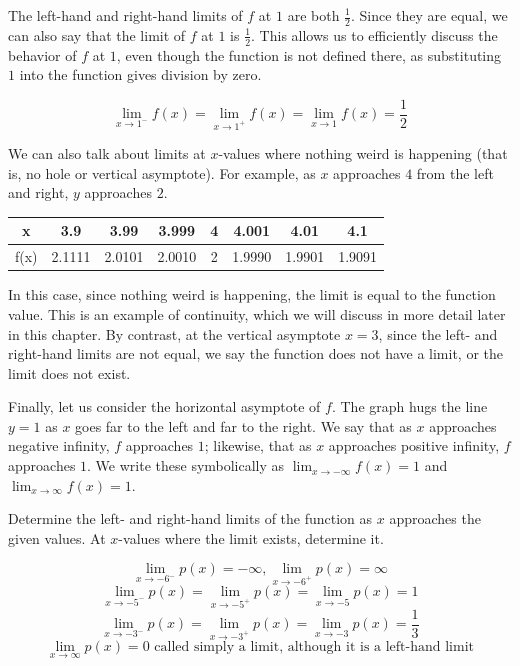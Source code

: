 The left-hand and right-hand limits of $ f $ at $ 1 $ are both $\frac{1}{2}$. Since 
they are equal, we can also say that the limit of $ f $ at $ 1 $ is $\frac{1}{2}$. 
This allows us to efficiently discuss the behavior of $ f $ at $ 1 $, even though 
the function is not defined there, as substituting $ 1 $ into the function gives 
division by zero.

$$ \lim_{x \rightarrow 1^-} f(x) = \lim_{x \rightarrow 1^+} f(x) = \lim_{x 
\rightarrow 1} f(x) = \frac{1}{2} $$

We can also talk about limits at $x$-values where nothing weird is happening (that 
is, no hole or vertical asymptote). For example, as $x$ approaches $4$ from the left 
and right, $y$ approaches $2$.

\begin{center}
\begin{tabular}{ |c|c|c|c|c|c|c|c| } 
 \hline
 x & 3.9 & 3.99 & 3.999 & 4 & 4.001 & 4.01 & 4.1 \\ 
 \hline
 f(x) & 2.1111 & 2.0101 & 2.0010 & 2 & 1.9990 & 1.9901 & 1.9091 \\ 
 \hline
\end{tabular}
\end{center}

In this case, since nothing weird is happening, the limit is equal to the function 
value. This is an example of continuity, which we will discuss in more detail later
in this chapter. By contrast, at the vertical asymptote $ x = 3 $, since the left-
and right-hand limits are not equal, we say the function does not have a limit, or 
the limit does not exist.

Finally, let us consider the horizontal asymptote of $f$. The graph hugs the line 
$y = 1$ as $x$ goes far to the left and far to the right. We say that as $x$ 
approaches negative infinity, $f$ approaches $1$; likewise, that as $x$ 
approaches positive infinity, $f$ approaches $1$. We write these symbolically as 
$\lim_{x \rightarrow -\infty} f(x) = 1$ and $\lim_{x \rightarrow \infty} f(x) = 1$. 

\begin{Exercise}[title=Limits Practice 1, label=limits1]
  Determine the left- and right-hand limits of the function as $x$ approaches the 
  given values. At $x$-values where the limit exists, determine it.
  \vspace{40mm}
\end{Exercise}
\begin{Answer}[ref=limits1] 
	$$ \lim_{x \rightarrow -6^-} p(x) = -\infty, \lim_{x \rightarrow -6^+} p(x) = \infty $$
	$$ \lim_{x \rightarrow -5^-} p(x) = \lim_{x \rightarrow -5^+} p(x) = \lim_{x \rightarrow -5} p(x) = 1 $$
	$$ \lim_{x \rightarrow -3^-} p(x) = \lim_{x \rightarrow -3^+} p(x) = \lim_{x \rightarrow -3} p(x) = \frac{1}{3} $$
	$$ \lim_{x \rightarrow \infty} p(x) = 0 \text{ called simply a limit, although it is a left-hand limit} $$
\end{Answer}

